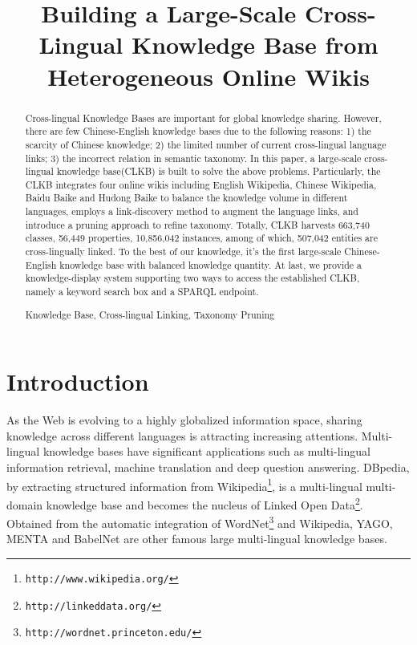 \documentclass[runningheads,a4paper]{llncs}
\newcommand{\keywords}[1]{\par\addvspace\baselineskip\noindent\keywordname\enspace\ignorespaces#1}
\begin{document}
\mainmatter

\title{Building a Large-Scale Cross-Lingual Knowledge Base from Heterogeneous Online Wikis}


\maketitle

\begin{abstract}
Cross-lingual Knowledge Bases are important for global knowledge sharing. However, there are few Chinese-English knowledge bases due to the following reasons: 1) the scarcity of Chinese knowledge; 2) the limited number of current cross-lingual language links; 3) the incorrect relation in semantic taxonomy. In this paper, a large-scale cross-lingual knowledge base(CLKB) is built to solve the above problems. Particularly, the CLKB integrates four online wikis including English Wikipedia, Chinese Wikipedia, Baidu Baike and Hudong Baike to balance the knowledge volume in different languages, employs a link-discovery method to augment the language links, and introduce a pruning approach to refine taxonomy. Totally, CLKB harvests 663,740 classes, 56,449 properties, 10,856,042 instances, among of which, 507,042 entities are cross-lingually linked. To the best of our knowledge, it's the first large-scale Chinese-English knowledge base with balanced knowledge quantity. At last, we provide a knowledge-display system supporting two ways to access the established CLKB, namely a keyword search box and a SPARQL endpoint. 

\keywords{Knowledge Base, Cross-lingual Linking, Taxonomy Pruning}
\end{abstract}

\section{Introduction}
As the Web is evolving to a highly globalized information space, sharing knowledge across different languages is attracting increasing attentions. Multi-lingual knowledge bases have significant applications such as multi-lingual information retrieval, machine translation and deep question answering. DBpedia, by extracting structured information from Wikipedia\footnote{{\tt http://www.wikipedia.org/}}, is a multi-lingual multi-domain knowledge base and becomes the nucleus of Linked Open Data\footnote{{\tt http://linkeddata.org/}}. Obtained from the automatic integration of WordNet\footnote{{\tt http://wordnet.princeton.edu/}} and Wikipedia, YAGO, MENTA and BabelNet are other famous large multi-lingual knowledge bases.
\end{document}
